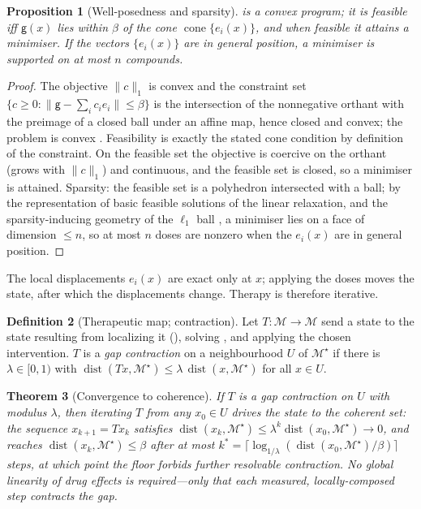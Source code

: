 \documentclass[11pt,a4paper]{article}
\theoremstyle{cfcthm}
\newtheorem{theorem}{Theorem}[section]
\newtheorem{proposition}[theorem]{Proposition}
\theoremstyle{definition}
\newtheorem{definition}[theorem]{Definition}
\theoremstyle{remark}
\newcommand{\Man}{\mathcal{M}}          %
\newcommand{\st}{x}                     %
\newcommand{\Coh}{\Man^{\star}}         %
\newcommand{\flo}{\beta}                %
\newcommand{\gap}{\mathsf{g}}           %
\newcommand{\dose}{c}                   %
\newcommand{\norm}[1]{\lVert#1\rVert}
\newcommand{\set}[1]{\{#1\}}
\newcommand{\dist}{\operatorname{dist}}
\begin{document}
\begin{proposition}[Well-posedness and sparsity]
\label{prop:closure-wellposed}
 is a convex program; it is feasible iff $\gap(\st)$ lies
within $\flo$ of the cone $\operatorname{cone}\set{e_i(\st)}$, and when feasible
it attains a minimiser. If the vectors $\set{e_i(\st)}$ are in general position,
a minimiser is supported on at most $n$ compounds.
\end{proposition}

\begin{proof}
The objective $\norm{\dose}_1$ is convex and the constraint set
$\set{\dose\ge0:\norm{\gap-\sum_i \dose_i e_i}\le\flo}$ is the intersection of
the nonnegative orthant with the preimage of a closed ball under an affine map,
hence closed and convex; the problem is convex
\citep{boyd2004convex}. Feasibility is exactly the stated cone condition by
definition of the constraint. On the feasible set the objective is coercive on
the orthant (grows with $\norm{\dose}_1$) and continuous, and the feasible set
is closed, so a minimiser is attained. Sparsity: the feasible set is a
polyhedron intersected with a ball; by the representation of basic feasible
solutions of the linear relaxation, and the sparsity-inducing geometry of the
$\ell_1$ ball \citep{tibshirani1996lasso,candes2006robust}, a minimiser lies on
a face of dimension $\le n$, so at most $n$ doses are nonzero when the
$e_i(\st)$ are in general position.
\end{proof}

The local displacements $e_i(\st)$ are exact only at $\st$; applying the doses
moves the state, after which the displacements change. Therapy is therefore
iterative.

\begin{definition}[Therapeutic map; contraction]
\label{def:contraction}
Let $T\colon\Man\to\Man$ send a state to the state resulting from localizing
it (), solving , and applying the chosen
intervention. $T$ is a \emph{gap contraction} on a neighbourhood $U$ of $\Coh$
if there is $\lambda\in[0,1)$ with $\dist(T\st,\Coh)\le\lambda\,\dist(\st,\Coh)$
for all $\st\in U$.
\end{definition}

\begin{theorem}[Convergence to coherence]
\label{thm:convergence}
If $T$ is a gap contraction on $U$ with modulus $\lambda$, then iterating $T$
from any $\st_0\in U$ drives the state to the coherent set: the sequence
$\st_{k+1}=T\st_k$ satisfies
$\dist(\st_k,\Coh)\le\lambda^{k}\dist(\st_0,\Coh)\to0$, and reaches
$\dist(\st_k,\Coh)\le\flo$ after at most
$k^{\ast}=\bigl\lceil\log_{1/\lambda}(\dist(\st_0,\Coh)/\flo)\bigr\rceil$
steps, at which point the floor forbids further resolvable contraction. No
global linearity of drug effects is required---only that each measured,
locally-composed step contracts the gap.
\end{theorem}
\end{document}
